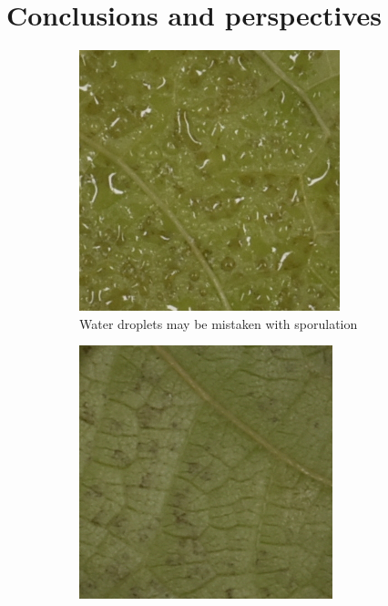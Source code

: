 \documentclass[english]{article}
\begin{document}
\section{Conclusions and perspectives}


\begin{figure}[H]
    \centering
    \begin{subfigure}[b]{0.45\linewidth}
        \includegraphics[width=\linewidth]{water.png}
        \caption{Water droplets may be mistaken with sporulation}\label{fig:error97water}
    \end{subfigure}
    \begin{subfigure}[b]{0.45\linewidth}
        \includegraphics[width=\linewidth]{error_97.png}

\end{subfigure}
\end{figure}
\end{document}
